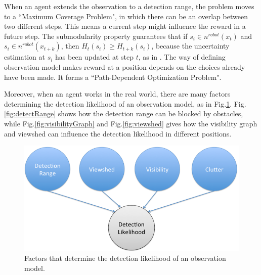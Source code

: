 \documentclass[12pt]{article}
\begin{document}
When an agent extends the observation to a detection range, the problem moves to a ``Maximum Coverage Problem", in which there can be an overlap between two different steps. This means a current step might influence the reward in a future step. The submodularity property guarantees that if $ s_{i} \in  n^{robot}(x_{t}) $ and $ s_{i} \in  n^{robot}(x_{t+k}) $, then $ H_{t}(s_{i}) \geq H_{t+k}(s_{i}) $, because the uncertainty estimation at $ s_{i} $ has been updated at step $ t $, as in \cite{krause2012submodular}. The way of defining observation model makes reward at a position depends on the choices already have been made. It forms a ``Path-Dependent Optimization Problem".

Moreover, when an agent works in the real world, there are many factors determining the detection likelihood of an observation model, as in Fig.\ref{fig:obsFactors}. Fig.\ref{fig:detectRange} shows how the detection range can be blocked by obstacles, while Fig.\ref{fig:visibilityGraph} and Fig.\ref{fig:viewshed} gives how the visibility graph and viewshed can influence the detection likelihood in different positions. 

\begin{figure}
\centering
\includegraphics[width=0.7\linewidth]{./images/obsFactors}
\caption{Factors that determine the detection likelihood of an observation model.}
\label{fig:obsFactors}
\end{figure}
\end{document}

